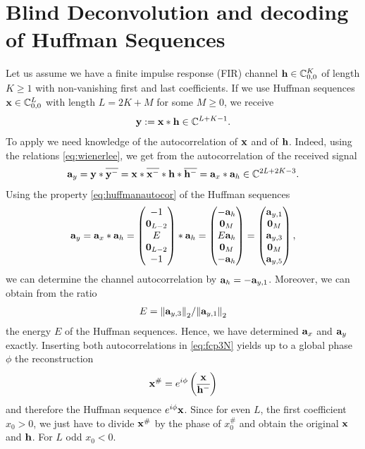 \documentclass[conference]{IEEEtran}
\begin{document}
\section{Blind Deconvolution and decoding of Huffman Sequences}\label{sec:blindhuff}

Let us assume we have a finite impulse response (FIR) channel ${\mathbf h}\in{\ensuremath{\mathbb C}}^{K}_{0,0}$ of length $K\geq 1$ with non-vanishing first and last
coefficients. If we use Huffman sequences ${\mathbf x}\in{\ensuremath{\mathbb C}}^{L}_{0,0}$ with length $L= 2K+M$ for some $M\geq 0$,
we  receive 
%
\begin{align}
  {\ensuremath{\mathbf y}}:={\mathbf x}*{\mathbf h}\in{\ensuremath{\mathbb C}}^{L+K-1}.
\end{align}
%
To apply  we need knowledge of the autocorrelation of ${\mathbf x}$ and of ${\mathbf h}$. Indeed, using the
 relations \eqref{eq:wienerlee}, we get from the autocorrelation of the received signal 
%
\begin{align}
  {\ensuremath{\mathbf a}}_y= {\mathbf y}*{\overline{{\mathbf y}^-}}={\mathbf x}*{\overline{{\mathbf x}^-}} * {\mathbf h}*{\overline{{\mathbf h}^-}} ={\mathbf a}_x*{\mathbf a}_h\in{\ensuremath{\mathbb C}}^{2L+2K-3}.
\end{align}
%
Using the property \eqref{eq:huffmanautocor} of the Huffman sequences   
%
\begin{align}
  {\ensuremath{\mathbf a}}_y= {\mathbf a}_x*{\mathbf a}_h=\begin{pmatrix}
    -1 \\ {\mathbf 0}_{L-2} \\ E \\ {\mathbf 0}_{L-2}\\ -1\end{pmatrix} * {\mathbf a}_h = \begin{pmatrix} -{\mathbf a}_h \\{\mathbf 0}_M \\ E
    {\mathbf a}_h \\{\mathbf 0}_M\\
    -{\mathbf a}_h \end{pmatrix}= \begin{pmatrix}{\ensuremath{\mathbf a}}_{y,1} \\{\mathbf 0}_M\\ {\mathbf a}_{y,3}\\ {\mathbf 0}_M \\
    {\mathbf a}_{y,5}\end{pmatrix},\label{eq:aynoisefree}
\end{align}
%
we can determine the channel autocorrelation  by ${\mathbf a}_h=-{\mathbf a}_{y,1}$. Moreover, we can obtain from the ratio
%
\begin{align}
  E= { \left\|{\mathbf a}_{y,3}\right\| _2}/{ \left\|{\mathbf a}_{y,1}\right\| _2}\label{eq:Eestimate}
\end{align}
%
the energy $E$ of the Huffman sequences. Hence, we have determined ${\mathbf a}_x$ and ${\mathbf a}_y$ exactly. 
Inserting both autocorrelations in \eqref{eq:fcp3N} yields up to a global phase $\phi$ the reconstruction 
%
\begin{align}
  {\ensuremath{\mathbf x}}^{\#}=e^{i\phi}\begin{pmatrix} {\ensuremath{\mathbf x}} \\ {\overline{{\mathbf h}^-}}\end{pmatrix}\label{eq:reconstructionx}
\end{align}
%
and therefore the Huffman sequence $e^{i\phi}{\mathbf x}$. Since for even $L$, the first coefficient $x_0>0$, we just have to
divide ${\mathbf x}^{\#}$ by the phase of $x_0^{\#}$ and obtain the original ${\mathbf x}$ and ${\mathbf h}$. For $L$ odd $x_0<0$. 
%
\end{document}
